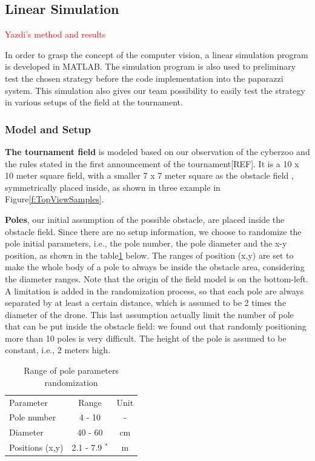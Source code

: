 \subsection{Linear Simulation}
\textcolor{red}{Yazdi's method and results}

In order to grasp the concept of the computer vision, a linear simulation program is developed in MATLAB. The simulation program is also used to preliminary test the chosen strategy before the code implementation into the paparazzi system. This simulation also gives our team possibility to easily test the strategy in various setups of the field at the tournament. 

\subsubsection{Model and Setup}
\textbf{The tournament field} is modeled based on our observation of the cyberzoo and the rules stated in the first announcement of the tournament[REF]. It is a 10 x 10 meter square field, with a smaller 7 x 7 meter square as the obstacle field , symmetrically placed inside, as shown in three example in Figure\ref{f:TopViewSamples}.

\textbf{Poles}, our initial assumption of the possible obstacle, are placed inside the obstacle field. Since there are no setup information, we choose to randomize the pole initial parameters, i.e., the pole number, the pole diameter and the x-y position, as shown in the table\ref{t:RandomPole} below. The ranges of position (x,y) are set to make the whole body of a pole to always be inside the obstacle area, considering the diameter ranges. Note that the origin of the field model is on the bottom-left. A limitation is added in the randomization process, so that each pole are always separated by at least a certain distance, which is assumed to be 2 times the diameter of the drone. This last assumption actually limit the number of pole that can be put inside the obstacle field: we found out that randomly positioning more than 10 poles is very difficult. The height of the pole is assumed  to be constant, i.e., 2 meters high. 

\begin{table}
\caption{Range of pole parameters randomization}
\label{t:RandomPole}
\begin{tabular}{lcc}
\hline \hline
Parameter & Range & Unit \\
Pole number & 4 - 10 & - \\
Diameter & 40 - 60 & cm \\
Positions (x,y) & 2.1 - 7.9 $^*$ & m \\
\end{tabular}
\end{table}


